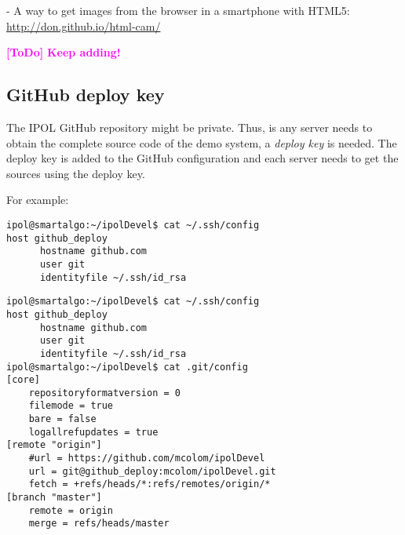 \documentclass[a4paper,12pt]{article}
\newcommand{\ToDo}[1]{\textcolor{magenta}{\textbf{[ToDo]} \textbf{#1}}}
\begin{document}
- A way to get images from the browser in a smartphone with HTML5: \url{http://don.github.io/html-cam/}


\ToDo{Keep adding!}

\subsection{GitHub deploy key}
The IPOL GitHub repository might be private. Thus, is any server needs to obtain the complete source code of the demo system, a \emph{deploy key} is needed. The deploy key is added to the GitHub configuration and each server needs to get the sources using the deploy key.

For example:

\begin{verbatim}
ipol@smartalgo:~/ipolDevel$ cat ~/.ssh/config 
host github_deploy
      hostname github.com
      user git
      identityfile ~/.ssh/id_rsa
\end{verbatim}

\vspace{0.15cm}

\begin{verbatim}
ipol@smartalgo:~/ipolDevel$ cat ~/.ssh/config 
host github_deploy
      hostname github.com
      user git
      identityfile ~/.ssh/id_rsa
ipol@smartalgo:~/ipolDevel$ cat .git/config 
[core]
	repositoryformatversion = 0
	filemode = true
	bare = false
	logallrefupdates = true
[remote "origin"]
	#url = https://github.com/mcolom/ipolDevel
	url = git@github_deploy:mcolom/ipolDevel.git
	fetch = +refs/heads/*:refs/remotes/origin/*
[branch "master"]
	remote = origin
	merge = refs/heads/master
\end{verbatim}





\end{document}

